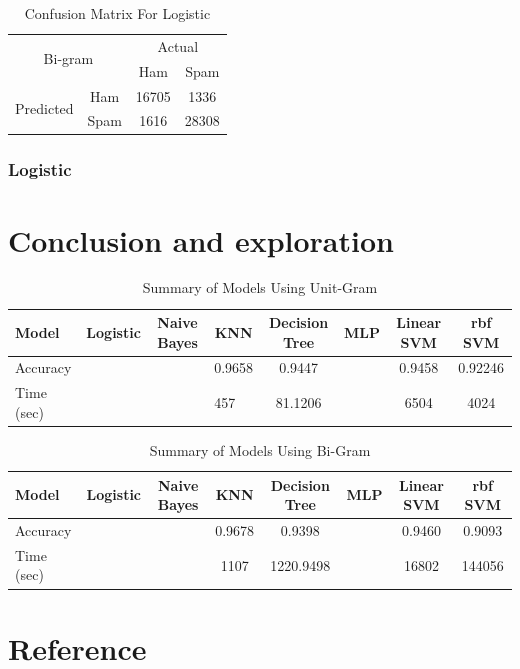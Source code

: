 \documentclass[12pt]{article}
\begin{document}
\begin{table}[H]
\begin{floatrow}
{\begin{subtable}{.5\textwidth}
\begin{tabular}{@{}|c|c|c|c|@{}}
					\multicolumn{2}{|c|}{\multirow{2}{*}{Bi-gram}} & \multicolumn{2}{c|}{Actual} \\ \cmidrule(l){3-4} 
					\multicolumn{2}{|c|}{}                        & Ham          & Spam         \\ \midrule
					\multirow{2}{*}{Predicted}       & Ham        & 16705        & 1336          \\ \cmidrule(l){2-4} 
					& Spam       & 1616          & 28308        \\ \bottomrule
				\end{tabular}
			\end{subtable}
		}{  
			\caption{Confusion Matrix For Logistic}  
			\label{Confusion_Logistic}  
		}  
	\end{floatrow}
\end{table} 




\subsubsection{Logistic}


\section{Conclusion and exploration}


\begin{table}[H]
	\centering
	\caption{Summary of Models Using Unit-Gram}
	\label{Summary-one-gram}
	\begin{tabular}{lccccccc}
		\hline
		Model      & Logistic             & Naive Bayes          & KNN                     & Decision Tree & MLP                  & Linear SVM & rbf SVM \\ \hline
		Accuracy   &                      &                      & 0.9658                  & 0.9447        &                      & 0.9458     & 0.92246 \\
		Time (sec) & \multicolumn{1}{l}{} & \multicolumn{1}{l}{} & \multicolumn{1}{l}{457} & 81.1206       & \multicolumn{1}{l}{} & 6504       & 4024    \\ \hline
	\end{tabular}
\end{table}


\begin{table}[H]
	\centering
	\caption{Summary of Models Using Bi-Gram}
	\label{Summary-bi-gram}
	\begin{tabular}{lccccccc}
		\hline
		Model      & Logistic & Naive Bayes & KNN    & Decision Tree & MLP & Linear SVM & rbf SVM \\ \hline
		Accuracy   &          &             & 0.9678 & 0.9398        &     & 0.9460     & 0.9093  \\
		Time (sec) &          &             & 1107   & 1220.9498     &     & 16802      & 144056  \\ \hline
	\end{tabular}
\end{table}

\section{Reference}
\end{document}
